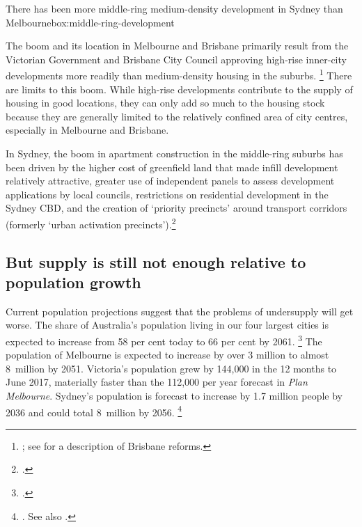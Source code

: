 \begin{bigbox}{There has been more middle-ring medium-density development in Sydney than Melbourne}{box:middle-ring-development}
\end{bigbox}

The boom and its location in Melbourne and Brisbane primarily result from the Victorian Government and Brisbane City Council approving high-rise inner-city developments more readily than medium-density housing in the suburbs.%
    \footnote{\textcite{Shoory2016Apartment}; see  for a description of Brisbane reforms.}
There are limits to this boom.
While high-rise developments contribute to the supply of housing in good locations, they can only add so much to the housing stock because they are generally limited to the relatively confined area of city centres, especially in Melbourne and Brisbane.

In Sydney, the boom in apartment construction in the middle-ring suburbs has been driven by the higher cost of greenfield land that made infill development relatively attractive, greater use of independent panels to assess development applications by local councils, restrictions on residential development in the Sydney CBD, and the creation of `priority precincts' around transport corridors (formerly `urban activation precincts').\footcite{KentPhibbs2017Charts}

\subsection{But supply is still not enough relative to population growth}\label{subsec:but-supply-is-still-not-enough-relative-to-population-growth}

Current population projections suggest that the problems of undersupply will get worse.
The share of Australia's population living in our four largest cities is expected to increase from 58 per cent today to 66 per cent by 2061.%
	\footcite{Terrill2016Roadsrichesbetter}
The population of Melbourne is expected to increase by over 3 million to almost 8~million by 2051.
Victoria's population grew by 144,000 in the 12 months to June 2017, materially faster than the 112,000 per year forecast in \textit{Plan Melbourne}.
Sydney's population is forecast to increase by 1.7 million people by 2036 and could total 8~million by 2056.%
	\footnote{\textcites{VicGovPlanMelb2017}{GreaterSyd2016}{ABS2013PopulationprojectionsAustralia}. See also \textcite{IA_2018_Future_cities}.}

